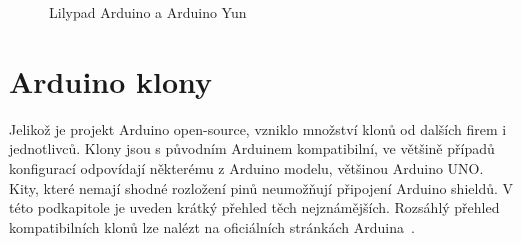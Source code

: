 	\begin{figure}[!ht]
    \centering
			\hspace*{5mm}
			\caption{Lilypad Arduino a Arduino Yun}
			\vspace{-10pt}	
\end{figure}
	

\section{Arduino klony}
\label{KapArduinoKlony}

	Jelikož je projekt Arduino open-source, vzniklo množství klonů od dalších firem i jednotlivců. Klony jsou s původním Arduinem kompatibilní, ve většině případů konfigurací odpovídají některému z Arduino modelu, většinou Arduino UNO. Kity, které nemají shodné rozložení pinů neumožňují připojení Arduino shieldů. V této podkapitole je uveden krátký přehled těch nejznámějších. Rozsáhlý přehled kompatibilních klonů lze nalézt na oficiálních stránkách Arduina~\cite{ArduinoClonesWeb}.
	
